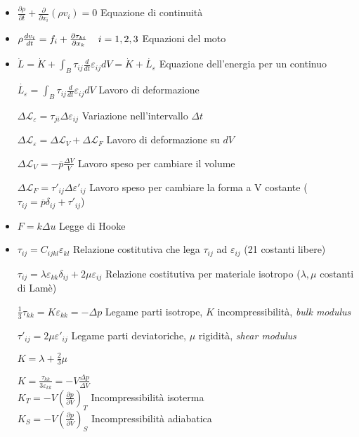 \documentclass[a4paper]{article}
\begin{document}
\begin{itemize}
	\item $\frac{\partial \rho}{\partial t}+\frac{\partial}{\partial x_i}(\rho v_i)=0$ Equazione di continuità
	
	\item $\rho \frac{d v_i}{dt}=f_i+\frac{\partial \tau_{ki}}{\partial x_k} \hspace{0.4cm} i=1,2,3$ Equazioni del moto
	
	\item $\dot{L}=\dot{K}+\int_{B} \tau_{ij} \frac{d}{dt}$$\varepsilon_{ij}dV=\dot{K}+\dot{L_\varepsilon}$ Equazione dell'energia per un continuo
	
	$\dot{L_\varepsilon}=\int_{B} \tau_{ij} \frac{d}{dt}$$\varepsilon_{ij}dV$ Lavoro di deformazione
	
	$\Delta \mathcal{L}_\varepsilon= \tau_{ji}\Delta \varepsilon_{ij}$ Variazione nell'intervallo $\Delta t$
	
	$\Delta \mathcal{L}_\varepsilon = \Delta \mathcal{L}_V + \Delta \mathcal{L}_F$ Lavoro di deformazione su $dV$
	
	$\Delta \mathcal{L}_V=-\overline{p} \frac{\Delta V}{V}$ Lavoro speso per cambiare il volume
	
	$\Delta \mathcal{L}_F = \tau'_{ij} \Delta \varepsilon'_{ij}$ Lavoro speso per cambiare la forma a V costante ($\tau_{ij}=\overline{p}\delta_{ij}+\tau'_{ij}$)
	
	\item $F = k \Delta u$ Legge di Hooke
	
	\item $\tau_{ij}=C_{ijkl} \varepsilon_{kl}$ Relazione costitutiva che lega $\tau_{ij}$ ad $\varepsilon_{ij}$ (21 costanti libere)
	
	$\tau_{ij}= \lambda \varepsilon_{kk} \delta_{ij}+2 \mu \varepsilon_{ij}$ Relazione costitutiva per materiale isotropo ($\lambda, \mu$ costanti di Lamè)
	
	$\frac{1}{3}\tau_{kk} = K \varepsilon_{kk}=-\Delta p$ Legame parti isotrope, $K$ incompressibilità, \textit{bulk modulus}
	
	$\tau'_{ij}=2 \mu \varepsilon'_{ij}$ Legame parti deviatoriche, $\mu$ rigidità, \textit{shear modulus}
	
	$K=\lambda + \frac{2}{3}\mu$
	
	$K=\frac{\tau_{kk}}{3\varepsilon_{kk}}=-V\frac{\Delta p}{\Delta V}$\\
	$K_T=-V(\frac{\partial p}{\partial V})_T$ Incompressibilità isoterma\\
	$K_S=-V(\frac{\partial p}{\partial V})_S$ Incompressibilità adiabatica
	

\end{itemize}
\end{document}

